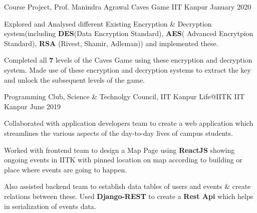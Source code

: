 \begin{cventries}
    
    
    \cventry
    {Course Project, Prof. Manindra Agrawal}
    {Caves Game}
    {IIT Kanpur}
    {January 2020}
    {
      \begin{cvitems}
        \item {Explored and Analysed different Existing  Encryption \& Decryption system(including\textbf{ DES}(Data Encryption Standard), \textbf{AES}( Advanced Encrytpion Standard),\textbf{ RSA} (Rivest, Shamir, Adleman)) and implemented these.}
        \item {Completed all \textbf{7} levels of the Caves Game using  these encryption and decryption system. Made use of these encryption and decryption systems to extract the key and unlock the subsequent levels of the game.}
      \end{cvitems}
    }
    
    \cventry
    {Programming Club, Science \& Technolgy Council, IIT Kanpur}
    {Life@IITK}
    {IIT Kanpur}
    {June 2019}
    {
      \begin{cvitems}
        \item {Collaborated with application developers team to create a web application which streamlines the various aspects of
        the day-to-day lives of campus students.}
        \item {Worked with frontend team to design a Map Page using \textbf{ReactJS} showing ongoing events in IITK with
        	pinned location on map according to building or place where events are going to happen. }
        \item{Also assisted backend team to establish data tables of users and events \& create relations between these. Used \textbf{Django-REST} to create a \textbf{Rest Api} which helps in serialization of events data.  }
      \end{cvitems}
    } 
    

\end{cventries}
